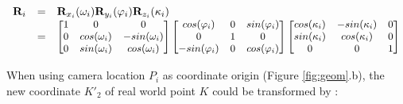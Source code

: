 \documentclass[doublespacing]{configs/bmcart}
\begin{document}
$$
\begin{array}{lll}
  \mathbf{R}_i & = & \mathbf{R}_{x_i}(\omega_i) \mathbf{R}_{y_i}(\varphi_i) \mathbf{R}_{z_i}(\kappa_i) \nonumber \\
  & = &
    \begin{small}
    \left[ 
      \begin{matrix} 
        1 & 0             & 0 \\
        0 & cos(\omega_i) & -sin(\omega_i) \\
        0 & sin(\omega_i) & cos(\omega_i)
      \end{matrix} 
    \right] 
    \left[ 
      \begin{matrix} 
        cos(\varphi_i)  & 0 & sin(\varphi_i) \\
        0               & 1 & 0 \\
        -sin(\varphi_i) & 0 & cos(\varphi_i)
      \end{matrix} 
    \right] 
    \left[ 
      \begin{matrix} 
        cos(\kappa_i) & -sin(\kappa_i) & 0 \\
        sin(\kappa_i) & cos(\kappa_i)  & 0 \\
        0             & 0              & 1
      \end{matrix} 
    \right] 
    \end{small}
\end{array}
$$

When using camera location $P_i$ as coordinate origin (Figure \ref{fig:geom}.b), the new coordinate $K'_2$ of real world point $K$ could be transformed by \cite{pix4d_support_how_2020}:
\end{document}
